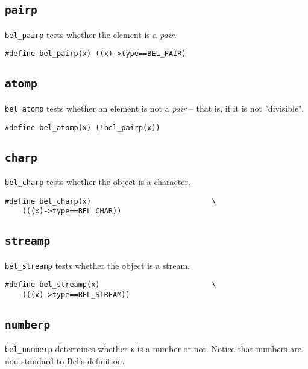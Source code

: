 \documentclass[openright,a4paper,twoside,12pt]{memoir}
\begin{document}
\subsection{\texttt{pairp}}
\label{sec:org114a409}

\texttt{bel\_pairp} tests whether the element is a \emph{pair}.

\begin{verbatim}
#define bel_pairp(x) ((x)->type==BEL_PAIR)
\end{verbatim}

\subsection{\texttt{atomp}}
\label{sec:orgff1a74d}

\texttt{bel\_atomp} tests whether an element is not a \emph{pair} -- that is, if it is
not "divisible".

\begin{verbatim}
#define bel_atomp(x) (!bel_pairp(x))
\end{verbatim}

\subsection{\texttt{charp}}
\label{sec:org82f7c5d}

\texttt{bel\_charp} tests whether the object is a character.

\begin{verbatim}
#define bel_charp(x)                            \
    (((x)->type==BEL_CHAR))
\end{verbatim}

\subsection{\texttt{streamp}}
\label{sec:org49b1acd}

\texttt{bel\_streamp} tests whether the object is a stream.

\begin{verbatim}
#define bel_streamp(x)                          \
    (((x)->type==BEL_STREAM))
\end{verbatim}

\subsection{\texttt{numberp}}
\label{sec:orgb5cb77c}

\texttt{bel\_numberp} determines whether \texttt{x} is a number or not. Notice that
numbers are non-standard to Bel's definition.
\end{document}
